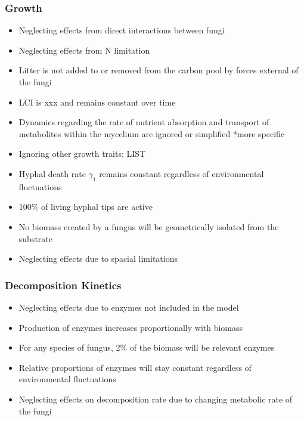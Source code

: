 \documentclass[12pt]{article}
\begin{document}
\begin{multicols}{2}
\subsubsection{Growth}
\begin{itemize}
	\item Neglecting effects from direct interactions between fungi
	\item Neglecting effects from N limitation
	\item Litter is not added to or removed from the carbon pool by forces external of the fungi
	\item LCI is xxx and remains constant over time
	\item Dynamics regarding the rate of nutrient absorption and transport of metabolites within the
	mycelium are ignored or simplified *more specific
	\item Ignoring other growth traits: LIST
	\item Hyphal death rate $\gamma_{1}$ remains constant regardless of environmental fluctuations
	\item 100\% of living hyphal tips are active
	\item No biomass created by a fungus will be geometrically isolated from the substrate
	\item Neglecting effects due to spacial limitations
\end{itemize}
\subsubsection{Decomposition Kinetics}
\begin{itemize}
	\item Neglecting effects due to enzymes not included in the model
	\item Production of enzymes increases proportionally with biomass
	\item For any species of fungus, 2\% of the biomass will be relevant enzymes
	\item Relative proportions of enzymes will stay constant regardless of environmental fluctuations
	\item Neglecting effects on decomposition rate due to changing metabolic rate of the fungi
\end{itemize}

\end{multicols}
\end{document}
